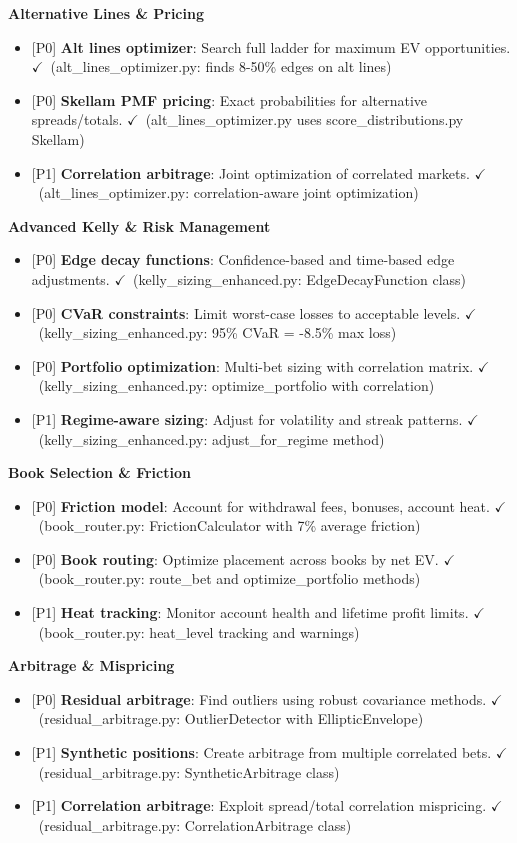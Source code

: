 \documentclass[11pt]{article}
\newcommand{\block}[1]{\par\noindent\textbf{#1}\par\vspace{0.25em}}
\newcommand{\done}{\textcolor{green!60!black}{\(\checkmark\)}}
\newcommand{\prio}[1]{\textcolor{blue!70!black}{[#1]}}
\begin{document}
\begin{itemize}
\block{Alternative Lines \& Pricing}
\begin{itemize}
  \item \prio{P0} \textbf{Alt lines optimizer}: Search full ladder for maximum EV opportunities. \done\ (alt\_lines\_optimizer.py: finds 8-50\% edges on alt lines)
  \item \prio{P0} \textbf{Skellam PMF pricing}: Exact probabilities for alternative spreads/totals. \done\ (alt\_lines\_optimizer.py uses score\_distributions.py Skellam)
  \item \prio{P1} \textbf{Correlation arbitrage}: Joint optimization of correlated markets. \done\ (alt\_lines\_optimizer.py: correlation-aware joint optimization)
\end{itemize}

\block{Advanced Kelly \& Risk Management}
\begin{itemize}
  \item \prio{P0} \textbf{Edge decay functions}: Confidence-based and time-based edge adjustments. \done\ (kelly\_sizing\_enhanced.py: EdgeDecayFunction class)
  \item \prio{P0} \textbf{CVaR constraints}: Limit worst-case losses to acceptable levels. \done\ (kelly\_sizing\_enhanced.py: 95\% CVaR = -8.5\% max loss)
  \item \prio{P0} \textbf{Portfolio optimization}: Multi-bet sizing with correlation matrix. \done\ (kelly\_sizing\_enhanced.py: optimize\_portfolio with correlation)
  \item \prio{P1} \textbf{Regime-aware sizing}: Adjust for volatility and streak patterns. \done\ (kelly\_sizing\_enhanced.py: adjust\_for\_regime method)
\end{itemize}

\block{Book Selection \& Friction}
\begin{itemize}
  \item \prio{P0} \textbf{Friction model}: Account for withdrawal fees, bonuses, account heat. \done\ (book\_router.py: FrictionCalculator with 7\% average friction)
  \item \prio{P0} \textbf{Book routing}: Optimize placement across books by net EV. \done\ (book\_router.py: route\_bet and optimize\_portfolio methods)
  \item \prio{P1} \textbf{Heat tracking}: Monitor account health and lifetime profit limits. \done\ (book\_router.py: heat\_level tracking and warnings)
\end{itemize}

\block{Arbitrage \& Mispricing}
\begin{itemize}
  \item \prio{P0} \textbf{Residual arbitrage}: Find outliers using robust covariance methods. \done\ (residual\_arbitrage.py: OutlierDetector with EllipticEnvelope)
  \item \prio{P1} \textbf{Synthetic positions}: Create arbitrage from multiple correlated bets. \done\ (residual\_arbitrage.py: SyntheticArbitrage class)
  \item \prio{P1} \textbf{Correlation arbitrage}: Exploit spread/total correlation mispricing. \done\ (residual\_arbitrage.py: CorrelationArbitrage class)
\end{itemize}


\end{itemize}
\end{document}
